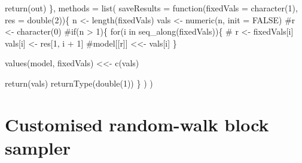 \documentclass[
]{article}
\newenvironment{Shaded}{\begin{snugshade}}{\end{snugshade}}
\newcommand{\AttributeTok}[1]{\textcolor[rgb]{0.40,0.45,0.13}{#1}}
\newcommand{\CommentTok}[1]{\textcolor[rgb]{0.37,0.37,0.37}{#1}}
\newcommand{\ConstantTok}[1]{\textcolor[rgb]{0.56,0.35,0.01}{#1}}
\newcommand{\ControlFlowTok}[1]{\textcolor[rgb]{0.00,0.23,0.31}{#1}}
\newcommand{\DecValTok}[1]{\textcolor[rgb]{0.68,0.00,0.00}{#1}}
\newcommand{\FunctionTok}[1]{\textcolor[rgb]{0.28,0.35,0.67}{#1}}
\newcommand{\NormalTok}[1]{\textcolor[rgb]{0.00,0.23,0.31}{#1}}
\newcommand{\OtherTok}[1]{\textcolor[rgb]{0.00,0.23,0.31}{#1}}
\newcommand{\SpecialCharTok}[1]{\textcolor[rgb]{0.37,0.37,0.37}{#1}}
\begin{document}
\begin{Shaded}
\begin{Highlighting}[]
    \FunctionTok{return}\NormalTok{(out)}
\NormalTok{  \},}
  \AttributeTok{methods =} \FunctionTok{list}\NormalTok{(}
    \AttributeTok{saveResults =} \ControlFlowTok{function}\NormalTok{(}\AttributeTok{fixedVals =} \FunctionTok{character}\NormalTok{(}\DecValTok{1}\NormalTok{),}
                           \AttributeTok{res =} \FunctionTok{double}\NormalTok{(}\DecValTok{2}\NormalTok{))\{}
\NormalTok{      n }\OtherTok{\textless{}{-}} \FunctionTok{length}\NormalTok{(fixedVals)}
\NormalTok{      vals }\OtherTok{\textless{}{-}} \FunctionTok{numeric}\NormalTok{(n, }\AttributeTok{init =} \ConstantTok{FALSE}\NormalTok{)}
      \CommentTok{\#r \textless{}{-} character(0)}
      \CommentTok{\#if(n \textgreater{} 1)\{}
      \ControlFlowTok{for}\NormalTok{(i }\ControlFlowTok{in} \FunctionTok{seq\_along}\NormalTok{(fixedVals))\{}
        \CommentTok{\# r \textless{}{-} fixedVals[i]}
\NormalTok{        vals[i] }\OtherTok{\textless{}{-}}\NormalTok{ res[}\DecValTok{1}\NormalTok{, i }\SpecialCharTok{+} \DecValTok{1}\NormalTok{]}
        \CommentTok{\#model[[r]] \textless{}\textless{}{-} vals[i]}
\NormalTok{      \}}

      \FunctionTok{values}\NormalTok{(model, fixedVals) }\OtherTok{\textless{}\textless{}{-}} \FunctionTok{c}\NormalTok{(vals)}

      \FunctionTok{return}\NormalTok{(vals)}
      \FunctionTok{returnType}\NormalTok{(}\FunctionTok{double}\NormalTok{(}\DecValTok{1}\NormalTok{))}
\NormalTok{    \}}
\NormalTok{  )}
\NormalTok{)}
\end{Highlighting}
\end{Shaded}

\hypertarget{customised-random-walk-block-sampler}{%
\section{Customised random-walk block
sampler}\label{customised-random-walk-block-sampler}}
\end{document}
